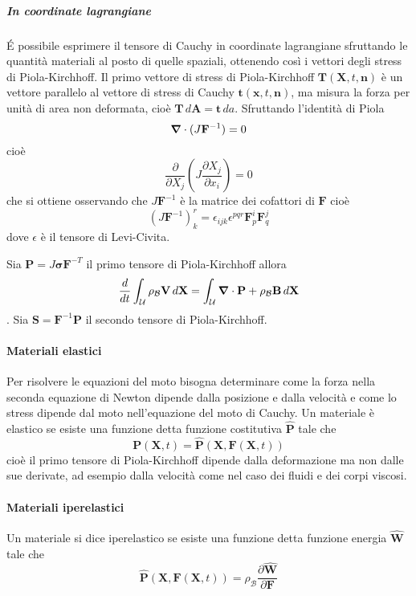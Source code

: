 \subparagraph{In coordinate lagrangiane}
\'E possibile esprimere il tensore di Cauchy in coordinate lagrangiane sfruttando le quantità materiali al posto di quelle spaziali, ottenendo così i vettori degli stress di Piola-Kirchhoff.
Il primo vettore di stress di Piola-Kirchhoff $\mathbf{T}(\mathbf{X},t,\mathbf{n})$ è un vettore parallelo al vettore di stress di Cauchy $\mathbf{t}(\mathbf{x},t,\mathbf{n})$, ma misura la forza per unità di area non deformata,
cioè $\mathbf{T}\,d\mathbf{A} = \mathbf{t}\,da$.
Sfruttando l'identità di Piola
$$
\boldsymbol{\nabla} \cdot (J\mathbf{F}^{-1}) = 0
$$
cioè
$$
\frac{\partial}{\partial X_j}(J\frac{\partial X_j}{\partial x_i}) = 0
$$
che si ottiene osservando che $J\mathbf{F}^{-1}$ è la matrice dei cofattori di $\mathbf{F}$ cioè
$$
(J\mathbf{F}^{-1})^r_k = \epsilon_{ijk}\epsilon^{pqr}\mathbf{F}^i_p\mathbf{F}^j_q
$$
dove $\epsilon$ è il tensore di Levi-Civita.

Sia $\mathbf{P}=J\boldsymbol{\sigma}\mathbf{F}^{-T}$ il primo tensore di Piola-Kirchhoff allora
$$\frac{d}{dt}\int_{\mathcal{U}}\rho_{\mathcal{B}}\mathbf{V}\, d\mathbf{X} = \int_\mathcal{U}\boldsymbol{\nabla}\cdot\mathbf{P}+\rho_{\mathcal{B}}\mathbf{B}\, d\mathbf{X} $$.
Sia $\mathbf{S}=\mathbf{F}^{-1}\mathbf{P}$ il secondo tensore di Piola-Kirchhoff.

\paragraph{Materiali elastici}
Per risolvere le equazioni del moto bisogna determinare come la forza nella seconda equazione di Newton dipende dalla posizione e dalla velocità e come lo stress dipende dal moto nell'equazione del moto di Cauchy. 
Un materiale è elastico se esiste una funzione detta funzione costitutiva $\hat{\mathbf{P}}$ tale che
$$\mathbf{P}(\mathbf{X},t)=\hat{\mathbf{P}}(\mathbf{X},\mathbf{F}(\mathbf{X},t)) $$
cioè il primo tensore di Piola-Kirchhoff dipende dalla deformazione ma non dalle sue derivate, ad esempio dalla velocità come nel caso dei fluidi e dei corpi viscosi.
\paragraph{Materiali iperelastici}
Un materiale si dice iperelastico se esiste una funzione detta funzione energia  $\widehat{\mathbf{W}}$ tale che 
$$\widehat{\mathbf{P}}(\mathbf{X},\mathbf{F}(\mathbf{X},t))=\rho_{\mathcal{B}}\frac{\partial \widehat{\mathbf{W}}}{\partial \mathbf{F}} $$
